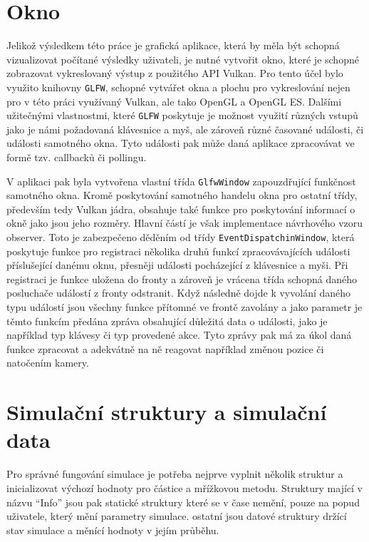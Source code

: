 \section{Okno}
\label{chapter:okno}
Jelikož výsledkem této práce je grafická aplikace, která by měla být schopná vizualizovat počítané výsledky uživateli, je nutné vytvořit okno, které je schopné zobrazovat vykreslovaný výstup z použitého API Vulkan. Pro tento účel bylo využito knihovny \texttt{GLFW}, schopné vytvářet okna a plochu pro vykreslování nejen pro v této práci využívaný Vulkan, ale tako OpenGL a OpenGL ES. Dalšími užitečnými vlastnostmi, které \texttt{GLFW} poskytuje je možnost využití různých vstupů jako je námi požadovaná klávesnice a myš, ale zároveň různé časované události, či události samotného okna. Tyto události pak může daná aplikace zpracovávat ve formě tzv. callbacků či pollingu. 

V aplikaci pak byla vytvořena vlastní třída \texttt{GlfwWindow} zapouzdřující funkčnost samotného okna. Kromě poskytování samotného handelu okna pro ostatní třídy, především tedy Vulkan jádra, obsahuje také funkce pro poskytování informací o okně jako jsou jeho rozměry. Hlavní částí je však implementace návrhového vzoru observer. Toto je zabezpečeno děděním od třídy \texttt{EventDispatchinWindow}, která poskytuje funkce pro registraci několika druhů funkcí zpracovávajících události příslušející danému oknu, přesněji události pocházející z klávesnice a myši. Při registraci je funkce uložena do fronty a zároveň je vrácena třída schopná daného posluchače událostí z fronty odstranit. Když následně dojde k vyvolání daného typu událostí jsou všechny funkce přítomné ve frontě zavolány a jako parametr je těmto funkcím předána zpráva obsahující důležitá data o události, jako je například typ klávesy či typ provedené akce. Tyto zprávy pak má za úkol daná funkce zpracovat a adekvátně na ně reagovat například změnou pozice či natočením kamery.


\section{Simulační struktury a simulační data}
\label{chapter:simStructData}
Pro správné fungování simulace je potřeba nejprve vyplnit několik struktur a inicializovat výchozí hodnoty pro částice a mřížkovou metodu. Struktury mající v názvu \enquote{Info} jsou pak statické struktury které se v čase nemění, pouze na popud uživatele, který mění parametry simulace. ostatní jsou datové struktury držící stav simulace a měnící hodnoty v jejím průběhu.

